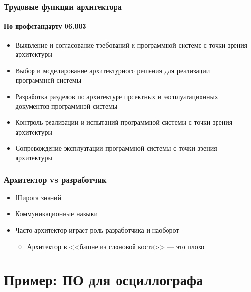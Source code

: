\documentclass{../cscslides}
\begin{document}
    \begin{frame}
        \frametitle{Трудовые функции архитектора}
        \framesubtitle{По профстандарту 06.003}
        \begin{itemize}
            \item Выявление и согласование требований к программной системе с точки зрения архитектуры
            \item Выбор и моделирование архитектурного решения для реализации программной системы
            \item Разработка разделов по архитектуре проектных и эксплуатационных документов программной системы
            \item Контроль реализации и испытаний программной системы с точки зрения архитектуры
            \item Сопровождение эксплуатации программной системы с точки зрения архитектуры
        \end{itemize}
    \end{frame}

    \begin{frame}
        \frametitle{Архитектор vs разработчик}
        \begin{itemize}
            \item Широта знаний
            \item Коммуникационные навыки
            \item Часто архитектор играет роль разработчика и наоборот
            \begin{itemize}
                \item Архитектор в <<башне из слоновой кости>> --- это плохо
            \end{itemize}
        \end{itemize}
    \end{frame}

    \section{Пример: ПО для осциллографа}
\end{document}
